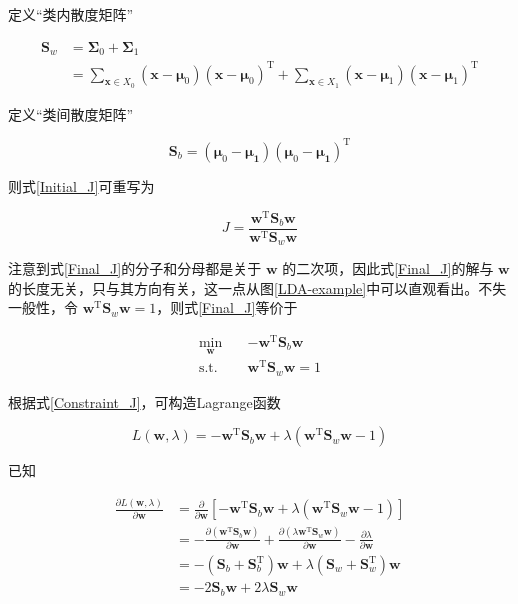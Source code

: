 \documentclass{ctexart}
\begin{document}
	定义“类内散度矩阵”
	
	\begin{equation}
		\label{EQ_Sw}
		\begin{aligned}
			\mathbf{S}_w&=\bm{\Sigma}_0+\bm{\Sigma}_1\\
			&=\sum_{\bm{x}\in X_0}(\bm{x}-\bm{\mu}_0)(\bm{x}-\bm{\mu}_0)^\mathrm{T}+\sum_{\bm{x}\in X_1}(\bm{x}-\bm{\mu}_1)(\bm{x}-\bm{\mu}_1)^\mathrm{T}
		\end{aligned}
	\end{equation}
	
	定义“类间散度矩阵”
	
	\begin{equation}
		\mathbf{S}_b=(\bm{\mu}_0-\bm{\mu_1})(\bm{\mu}_0-\bm{\mu_1})^\mathrm{T}
	\end{equation}
	
	则式\eqref{Initial_J}可重写为
	
	\begin{equation}
		J=\frac{\bm{w}^\mathrm{T}\mathbf{S}_b\bm{w}}{\bm{w}^\mathrm{T}\mathbf{S}_w\bm{w}}
		\label{Final_J}
	\end{equation}

	注意到式\eqref{Final_J}的分子和分母都是关于 $\bm{w}$ 的二次项，因此式\eqref{Final_J}的解与 $\bm{w}$ 的长度无关，只与其方向有关，这一点从图\ref{LDA-example}中可以直观看出。不失一般性，令 $\bm{w}^\mathrm{T}\mathbf{S}_w\bm{w}=1$，则式\eqref{Final_J}等价于
	
	\begin{equation}
		\begin{aligned}
			\min_{\bm{w}}\quad &-\bm{w}^\mathrm{T}\mathbf{S}_b\bm{w}\\
			\text{s.t.}\quad &\bm{w}^\mathrm{T}\mathbf{S}_w\bm{w}=1
		\end{aligned}
		\label{Constraint_J}
	\end{equation}

	根据式\eqref{Constraint_J}，可构造Lagrange函数
	
	\begin{equation}
		L(\bm{w},\lambda)=-\bm{w}^\mathrm{T}\mathbf{S}_b\bm{w}+\lambda(\bm{w}^\mathrm{T}\mathbf{S}_w\bm{w}-1)
	\end{equation}

	已知
	
	\begin{equation}
		\begin{aligned}
			\frac{\partial L(\bm{w},\lambda)}{\partial\bm{w}}&=\frac{\partial}{\partial\bm{w}}[-\bm{w}^\mathrm{T}\mathbf{S}_b\bm{w}+\lambda(\bm{w}^\mathrm{T}\mathbf{S}_w\bm{w}-1)]\\
			&=-\frac{\partial(\bm{w}^\mathrm{T}\mathbf{S}_b\bm{w})}{\partial\bm{w}}+\frac{\partial(\lambda\bm{w}^\mathrm{T}\mathbf{S}_w\bm{w})}{\partial\bm{w}}-\frac{\partial\lambda}{\partial\bm{w}}\\
			&=-(\mathbf{S}_b+\mathbf{S}_b^\mathrm{T})\bm{w}+\lambda(\mathbf{S}_w+\mathbf{S}_w^\mathrm{T})\bm{w}\\
			&=-2\mathbf{S}_b\bm{w}+2\lambda\mathbf{S}_w\bm{w}
		\end{aligned}
	\end{equation}
\end{document}
